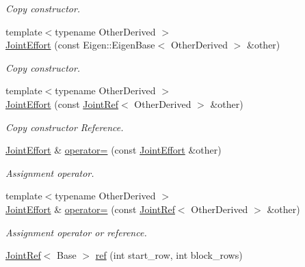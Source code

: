 \begin{DoxyCompactItemize}
\begin{DoxyCompactList}\small\item\em Copy constructor. \end{DoxyCompactList}\item 
{\footnotesize template$<$typename Other\+Derived $>$ }\\\hyperlink{classow__core_1_1JointEffort_ab554628edbca575f0134f5604bedbdec}{Joint\+Effort} (const Eigen\+::\+Eigen\+Base$<$ Other\+Derived $>$ \&other)
\begin{DoxyCompactList}\small\item\em Copy constructor. \end{DoxyCompactList}\item 
{\footnotesize template$<$typename Other\+Derived $>$ }\\\hyperlink{classow__core_1_1JointEffort_abee926761a4e34bb6d2730ab8fefa3e4}{Joint\+Effort} (const \hyperlink{classow__core_1_1JointRef}{Joint\+Ref}$<$ Other\+Derived $>$ \&other)
\begin{DoxyCompactList}\small\item\em Copy constructor Reference. \end{DoxyCompactList}\item 
\hyperlink{classow__core_1_1JointEffort}{Joint\+Effort} \& \hyperlink{classow__core_1_1JointEffort_a6384197d96855a781cdc15f93374fb50}{operator=} (const \hyperlink{classow__core_1_1JointEffort}{Joint\+Effort} \&other)\hypertarget{classow__core_1_1JointEffort_a6384197d96855a781cdc15f93374fb50}{}\label{classow__core_1_1JointEffort_a6384197d96855a781cdc15f93374fb50}

\begin{DoxyCompactList}\small\item\em Assignment operator. \end{DoxyCompactList}\item 
{\footnotesize template$<$typename Other\+Derived $>$ }\\\hyperlink{classow__core_1_1JointEffort}{Joint\+Effort} \& \hyperlink{classow__core_1_1JointEffort_a04026ca88ebecba4820cff2579162f5c}{operator=} (const \hyperlink{classow__core_1_1JointRef}{Joint\+Ref}$<$ Other\+Derived $>$ \&other)\hypertarget{classow__core_1_1JointEffort_a04026ca88ebecba4820cff2579162f5c}{}\label{classow__core_1_1JointEffort_a04026ca88ebecba4820cff2579162f5c}

\begin{DoxyCompactList}\small\item\em Assignment operator or reference. \end{DoxyCompactList}\item 
\hyperlink{classow__core_1_1JointRef}{Joint\+Ref}$<$ Base $>$ \hyperlink{classow__core_1_1JointEffort_af2109804ae0d2b8fecdfc8b40fd53590}{ref} (int start\+\_\+row, int block\+\_\+rows)\hypertarget{classow__core_1_1JointEffort_af2109804ae0d2b8fecdfc8b40fd53590}{}\label{classow__core_1_1JointEffort_af2109804ae0d2b8fecdfc8b40fd53590}


\end{DoxyCompactItemize}
